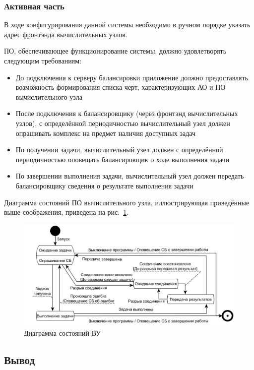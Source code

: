 \documentclass[a4paper,12pt]{report}
\numberwithin{equation}{section}
\begin{document}
\subsubsection{Активная часть}
В ходе конфигурирования данной системы необходимо в ручном порядке указать адрес фронтэнда вычислительных узлов.

ПО, обеспечивающее функционирование системы, должно удовлетворять следующим требованиям:
\begin{itemize}
  \item До подключения к серверу балансировки приложение должно предоставлять возможность формирования списка черт, характеризующих АО и ПО вычислительного узла
  \item После подключения к балансировщику (через фронтэнд вычислительных узлов), с определённой периодичностью вычислительный узел должен опрашивать комплекс на предмет наличия доступных задач
  \item По получении задачи, вычислительный узел должен с определённой периодичностью оповещать балансировщик о ходе выполнения задачи
  \item По завершении выполнения задачи, вычислительный узел должен передать балансировщику сведения о результате выполнения задачи
\end{itemize}

Диаграмма состояний ПО вычислительного узла, иллюстрирующая приведённые выше соображения, приведена на рис.~\ref{fig:node-state}.

\begin{figure}
  \centering
  \includegraphics[width=\linewidth]{diagrams/compnode/state}
  \caption{Диаграмма состояний ВУ}
  \label{fig:node-state}
\end{figure}

\subsection{Вывод}
\end{document}
